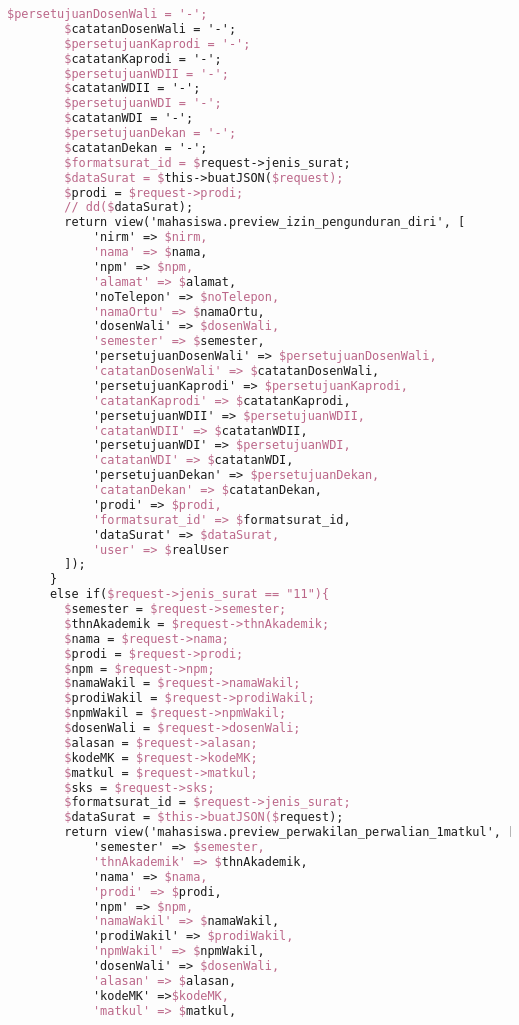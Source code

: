 \begin{lstlisting}[language=tex,basicstyle=\tiny,caption=PesanansuratController.php]
        $persetujuanDosenWali = '-';
        $catatanDosenWali = '-';
        $persetujuanKaprodi = '-';
        $catatanKaprodi = '-';
        $persetujuanWDII = '-';
        $catatanWDII = '-';
        $persetujuanWDI = '-';
        $catatanWDI = '-';
        $persetujuanDekan = '-';
        $catatanDekan = '-';
        $formatsurat_id = $request->jenis_surat;
        $dataSurat = $this->buatJSON($request);
        $prodi = $request->prodi;
        // dd($dataSurat);
        return view('mahasiswa.preview_izin_pengunduran_diri', [
            'nirm' => $nirm,
            'nama' => $nama,
            'npm' => $npm,
            'alamat' => $alamat,
            'noTelepon' => $noTelepon,
            'namaOrtu' => $namaOrtu,
            'dosenWali' => $dosenWali,
            'semester' => $semester,
            'persetujuanDosenWali' => $persetujuanDosenWali,
            'catatanDosenWali' => $catatanDosenWali,
            'persetujuanKaprodi' => $persetujuanKaprodi,
            'catatanKaprodi' => $catatanKaprodi,
            'persetujuanWDII' => $persetujuanWDII,
            'catatanWDII' => $catatanWDII,
            'persetujuanWDI' => $persetujuanWDI,
            'catatanWDI' => $catatanWDI,
            'persetujuanDekan' => $persetujuanDekan,
            'catatanDekan' => $catatanDekan,
            'prodi' => $prodi,
            'formatsurat_id' => $formatsurat_id,
            'dataSurat' => $dataSurat,
            'user' => $realUser
        ]);
      }
      else if($request->jenis_surat == "11"){
        $semester = $request->semester;
        $thnAkademik = $request->thnAkademik;
        $nama = $request->nama;
        $prodi = $request->prodi;
        $npm = $request->npm;
        $namaWakil = $request->namaWakil;
        $prodiWakil = $request->prodiWakil;
        $npmWakil = $request->npmWakil;
        $dosenWali = $request->dosenWali;
        $alasan = $request->alasan;
        $kodeMK = $request->kodeMK;
        $matkul = $request->matkul;
        $sks = $request->sks;
        $formatsurat_id = $request->jenis_surat;
        $dataSurat = $this->buatJSON($request);
        return view('mahasiswa.preview_perwakilan_perwalian_1matkul', [
            'semester' => $semester,
            'thnAkademik' => $thnAkademik,
            'nama' => $nama,
            'prodi' => $prodi,
            'npm' => $npm,
            'namaWakil' => $namaWakil,
            'prodiWakil' => $prodiWakil,
            'npmWakil' => $npmWakil,
            'dosenWali' => $dosenWali,
            'alasan' => $alasan,
            'kodeMK' =>$kodeMK,
            'matkul' => $matkul,

\end{lstlisting}
